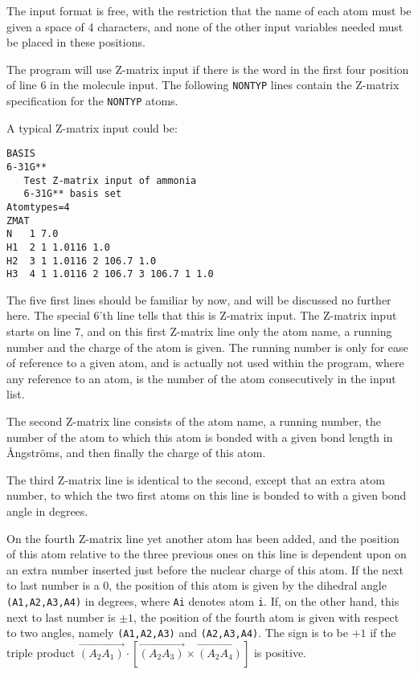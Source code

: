 The input format is free, with
the restriction that the name of each atom must be given a space
of 4 characters, and none of the other input variables needed must be
placed in these positions.

The program will use Z-matrix input if there is
the word  
in the first four position of line 6 in the molecule input.
The following {\tt NONTYP} lines contain the Z-matrix specification
for the {\tt NONTYP} atoms.

A typical Z-matrix input could be:
\begin{verbatim}
BASIS
6-31G**
   Test Z-matrix input of ammonia
   6-31G** basis set
Atomtypes=4
ZMAT
N   1 7.0
H1  2 1 1.0116 1.0
H2  3 1 1.0116 2 106.7 1.0
H3  4 1 1.0116 2 106.7 3 106.7 1 1.0
\end{verbatim}
The five first lines should be familiar by now, and will be discussed
no further here. 
The special 6'th line tells that this is Z-matrix input.
The Z-matrix input starts on line 7, and on this first Z-matrix
line only the atom name, a running number and the charge of the
atom
is given. The running number is only for
ease of reference to a given atom, and is actually not used within the
program, where any reference to an atom, is the number of the
atom consecutively in the input list.

The second Z-matrix line consists of the atom name, a running number, the
number of the atom to which this atom is bonded with a given bond
length in {\AA}ngstr{\"o}ms, and then finally the charge of this atom.

The third Z-matrix line is identical to the second, except that an extra atom
number, to which the two first atoms on this line is bonded to with a
given bond angle in degrees.

On the fourth Z-matrix line yet another atom has been added, and the position
of this atom relative to the three previous ones on this line is
dependent upon on an extra number inserted just before the nuclear
charge of this atom. If the next to last number is a 0, the
position of this atom is given by the dihedral angle {\tt
(A1,A2,A3,A4)} in degrees, where {\tt Ai} denotes atom {\tt i}. If, on the other
hand, this next to last number is $\pm 1$, the position of the fourth
atom is given with respect to two angles, namely {\tt (A1,A2,A3)} and
{\tt (A2,A3,A4)}. The sign is to be $+ 1$ if the triple product
$\overrightarrow{\left(A_{2}A_{1}\right)}\cdot\left[\overrightarrow{\left(A_{2}A_{3}\right)}\times\overrightarrow{\left(A_{2}A_{4}\right)}\right]$
is positive.

